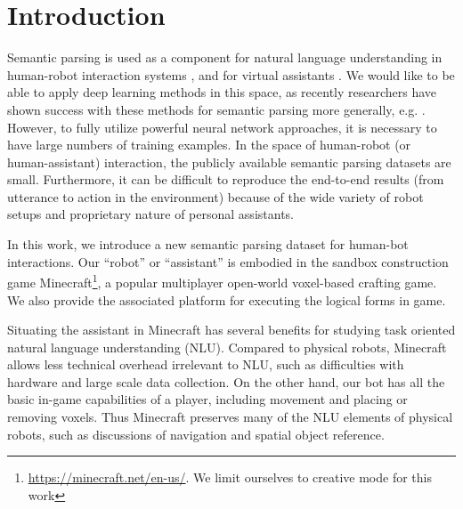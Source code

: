 \section{Introduction} 
Semantic parsing is used as a component for natural language understanding in human-robot interaction systems \cite{lauria2001training, bos2007spoken, tellex2011understanding, matuszek2013learning, thomason2019improving}, and for virtual assistants  \cite{kollar2018alexa}.  We would like to be able to apply deep learning methods in this space, as recently researchers have shown success with these methods for semantic parsing more generally, e.g. \cite{dong2016language, jia2016data, zhong2017seq2sql}. However, to fully utilize powerful neural network approaches, it is necessary to have large numbers of training examples. In the space of human-robot (or human-assistant) interaction, the publicly available semantic parsing datasets are small. Furthermore, it can be difficult to reproduce the end-to-end results (from utterance to action in the environment) because of the wide variety of robot setups and proprietary nature of personal assistants.

In this work, we introduce a new semantic parsing dataset for human-bot interactions. Our ``robot'' or ``assistant''  is embodied in the sandbox construction game Minecraft\footnote{\url{https://minecraft.net/en-us/}.  We limit ourselves to creative mode for this work}, a popular multiplayer open-world voxel-based crafting game. We also provide the associated platform for executing the logical forms in game.

Situating the assistant in Minecraft has several benefits for studying task oriented natural language understanding (NLU). Compared to physical robots, Minecraft allows less technical overhead irrelevant to NLU, such as difficulties with hardware and large scale data collection. On the other hand, our bot has all the basic in-game capabilities of a player, including movement and placing or removing voxels. Thus Minecraft preserves many of the NLU elements of physical robots, such as discussions of navigation and spatial object reference. 
 


